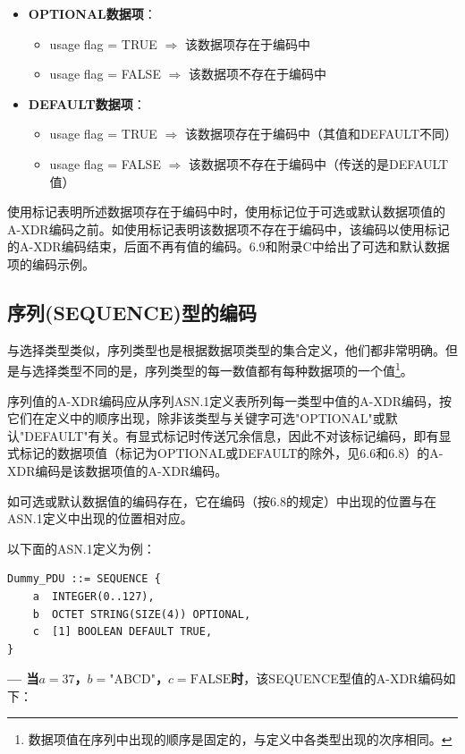\documentclass[a4paper,11pt]{ctexart}
\begin{document}
\begin{itemize}
\item \textbf{OPTIONAL数据项}：
  \begin{itemize}
  \item usage flag = TRUE $\Rightarrow$ 该数据项存在于编码中
  \item usage flag = FALSE $\Rightarrow$ 该数据项不存在于编码中
  \end{itemize}
\item \textbf{DEFAULT数据项}：
  \begin{itemize}
  \item usage flag = TRUE $\Rightarrow$ 该数据项存在于编码中（其值和DEFAULT不同）
  \item usage flag = FALSE $\Rightarrow$ 该数据项不存在于编码中（传送的是DEFAULT值）
  \end{itemize}
\end{itemize}

使用标记表明所述数据项存在于编码中时，使用标记位于可选或默认数据项值的A-XDR编码之前。如使用标记表明该数据项不存在于编码中，该编码以使用标记的A-XDR编码结束，后面不再有值的编码。6.9和附录C中给出了可选和默认数据项的编码示例。

\subsection{序列(SEQUENCE)型的编码}

与选择类型类似，序列类型也是根据数据项类型的集合定义，他们都非常明确。但是与选择类型不同的是，序列类型的每一数值都有每种数据项的一个值\footnote{数据项值在序列中出现的顺序是固定的，与定义中各类型出现的次序相同。}。

序列值的A-XDR编码应从序列ASN.1定义表所列每一类型中值的A-XDR编码，按它们在定义中的顺序出现，除非该类型与关键字可选"OPTIONAL"或默认"DEFAULT"有关。有显式标记时传送冗余信息，因此不对该标记编码，即有显式标记的数据项值（标记为OPTIONAL或DEFAULT的除外，见6.6和6.8）的A-XDR编码是该数据项值的A-XDR编码。

如可选或默认数据值的编码存在，它在编码（按6.8的规定）中出现的位置与在ASN.1定义中出现的位置相对应。

以下面的ASN.1定义为例：
\begin{verbatim}
Dummy_PDU ::= SEQUENCE {
    a  INTEGER(0..127),
    b  OCTET STRING(SIZE(4)) OPTIONAL,
    c  [1] BOOLEAN DEFAULT TRUE,
}
\end{verbatim}

\noindent\textbf{--- 当$a=37$，$b=\text{"ABCD"}$，$c=\text{FALSE}$时}，该SEQUENCE型值的A-XDR编码如下：
\end{document}
